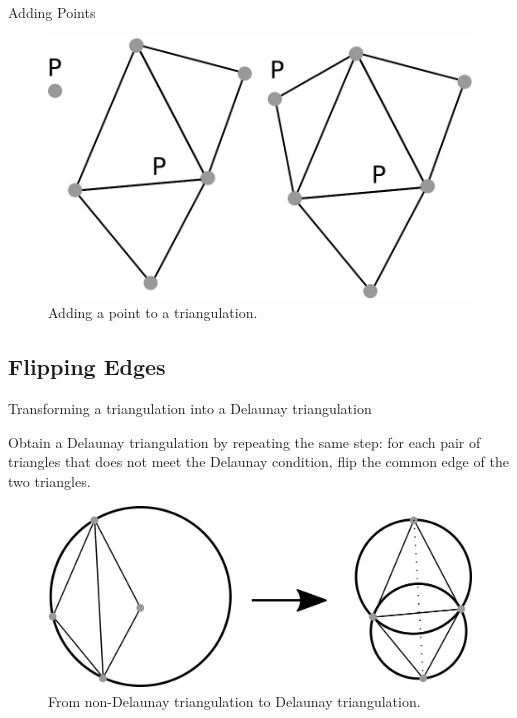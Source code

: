\documentclass[18pt]{beamer}
\begin{document}
\begin{frame}{Adding Points}
\begin{overprint}
  
  \begin{figure}
\centering
\includegraphics[scale=0.8]{adding3}
\caption{Adding a point to a triangulation.}
\end{figure}

\end{overprint}


\end{frame}


\subsection{Flipping Edges}
\begin{frame}{Transforming a triangulation into a Delaunay triangulation}

Obtain a Delaunay triangulation by repeating the same step: for each pair of triangles that does not meet the Delaunay condition, flip the common edge of the two triangles.

\begin{figure}
\centering
\includegraphics[scale=1]{dessin1}
\caption{\label{DelaunayTriangulation} From non-Delaunay triangulation to Delaunay triangulation.}
\end{figure}
 
\end{frame}
\end{document}
